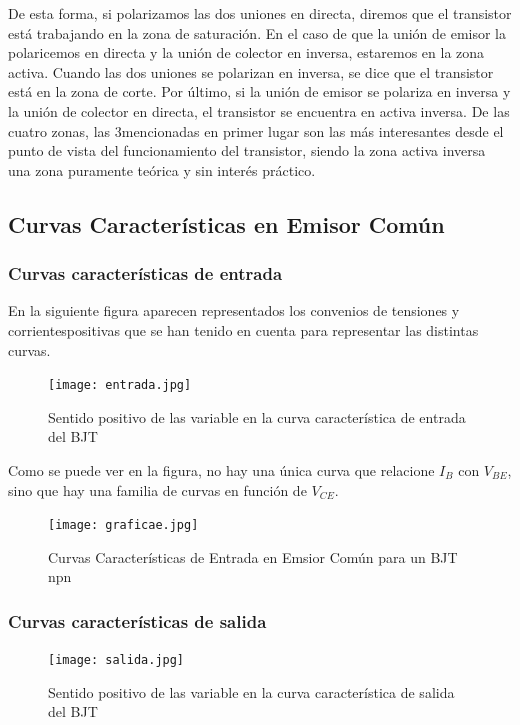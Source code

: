 \documentclass[10pt, a4paper]{article}
\begin{document}
    De esta forma, si polarizamos las dos uniones en directa, diremos que el transistor está trabajando en la zona de saturación. En el caso de que la unión de emisor la polaricemos en directa y la unión de colector en inversa, estaremos en la zona activa. Cuando las dos uniones se polarizan en inversa, se dice que el transistor está en la zona de corte. Por último, si la unión de emisor se polariza en inversa y la unión de colector en directa, el transistor se encuentra en activa inversa. De las cuatro zonas, las 3mencionadas en primer lugar son las más interesantes desde el punto de vista del funcionamiento del transistor, siendo la zona activa inversa una zona puramente teórica y sin interés práctico.

    \subsection{Curvas Características en Emisor Común}

    \subsubsection{Curvas características de entrada}

    En la siguiente figura aparecen representados los convenios de tensiones y corrientespositivas que se han tenido en cuenta para representar las distintas curvas.

    \begin{figure}[h!]
        \centering
        \texttt{[image: entrada.jpg]}
        \caption{\label{fig:3} Sentido positivo de las variable en la curva característica de entrada del BJT}
    \end{figure}

    Como se puede ver en la figura, no hay una única curva que relacione $I_B$ con $V_{BE}$, sino que hay una familia de curvas en función de $V_{CE}$.

    \begin{figure}[h!]
        \centering
        \texttt{[image: graficae.jpg]}
        \caption{\label{fig:4} Curvas Características de Entrada en Emsior Común para un BJT npn}
    \end{figure}

    \subsubsection{Curvas características de salida}

    \begin{figure}[h!]
        \centering
        \texttt{[image: salida.jpg]}
        \caption{\label{fig:5} Sentido positivo de las variable en la curva característica de salida del BJT}
    \end{figure}
\end{document}
